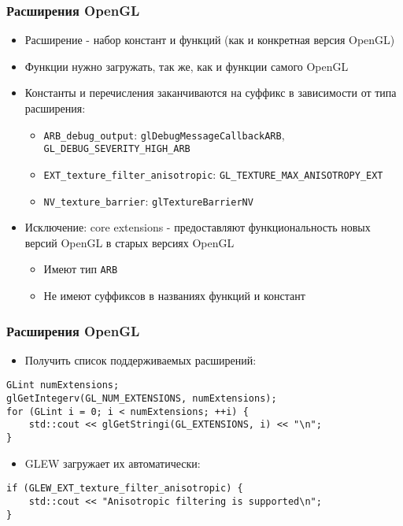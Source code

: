 \documentclass{beamer}
\begin{document}
\begin{frame}[fragile]
\frametitle{Расширения OpenGL}
\begin{itemize}
\item Расширение - набор констант и функций (как и конкретная версия OpenGL)
\pause
\item Функции нужно загружать, так же, как и функции самого OpenGL
\pause
\item Константы и перечисления заканчиваются на суффикс в зависимости от типа расширения:
\begin{itemize}
\item \verb|ARB_debug_output|: \verb|glDebugMessageCallbackARB|, \verb|GL_DEBUG_SEVERITY_HIGH_ARB|
\item \verb|EXT_texture_filter_anisotropic|: \verb|GL_TEXTURE_MAX_ANISOTROPY_EXT|
\item \verb|NV_texture_barrier|: \verb|glTextureBarrierNV|
\end{itemize}
\pause
\item Исключение: core extensions - предоставляют функциональность новых версий OpenGL в старых версиях OpenGL
\begin{itemize}
\item Имеют тип \verb|ARB|
\item Не имеют суффиксов в названиях функций и констант
\end{itemize}  
\end{itemize}
\end{frame}

\begin{frame}[fragile]
\frametitle{Расширения OpenGL}
\begin{itemize}
\item Получить список поддерживаемых расширений:
\end{itemize}
\begin{verbatim}
GLint numExtensions;
glGetIntegerv(GL_NUM_EXTENSIONS, numExtensions);
for (GLint i = 0; i < numExtensions; ++i) {
    std::cout << glGetStringi(GL_EXTENSIONS, i) << "\n";
}
\end{verbatim}
\pause
\begin{itemize}
\item GLEW загружает их автоматически:
\end{itemize}
\begin{verbatim}
if (GLEW_EXT_texture_filter_anisotropic) {
    std::cout << "Anisotropic filtering is supported\n";
}
\end{verbatim}
\end{frame}
\end{document}
